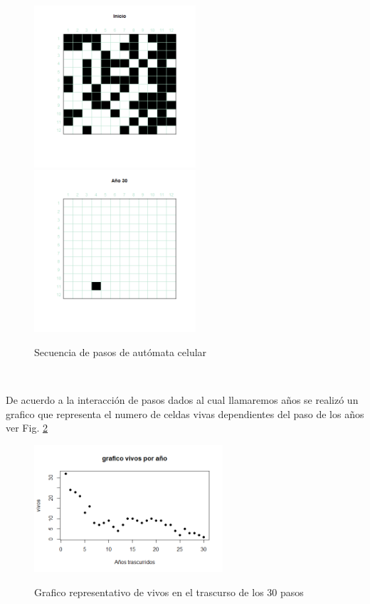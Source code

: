 \documentclass[a4paper]{article}
\begin{document}
\begin{figure}[h]
    \centering
     \includegraphics[width=60mm]{practica2_t0_r.png}
      \includegraphics[width=60mm]{practica2_t30_r.png}
    \caption\\Secuencia de pasos de autómata celular{\label{Fig.1}
    \label{practica2_t0_r.png}}
\end{figure}

\justify De acuerdo a la interacción de pasos dados al cual llamaremos años se realizó un grafico que representa el numero de celdas vivas dependientes del paso de los años ver Fig. \ref{fig:my_label}
\begin{figure}[h]
    \centering
    \includegraphics [width=70mm]{Rplot01.png}
    \caption   \\
    Grafico representativo de vivos en el trascurso de los 30 pasos {\label{fig}}
    \label{fig:my_label}
\end{figure}
\end{document}

